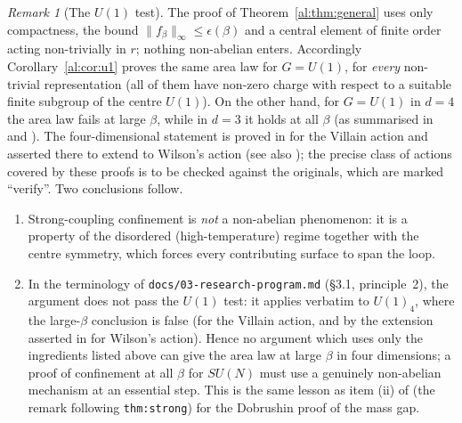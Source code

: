 \documentclass[11pt,a4paper]{article}
\theoremstyle{definition}
\theoremstyle{remark}
\newtheorem{remark}[theorem]{Remark}
\newcommand{\norm}[1]{\lVert #1\rVert}
\newcommand{\Fname}[2]{\cite[#1~`#2']{F}}
\begin{document}
\begin{remark}[The $U(1)$ test]\label{al:rem:u1test}
The proof of Theorem~\ref{al:thm:general} uses only compactness, the bound $\norm{f_\beta}_\infty\le\epsilon(\beta)$ and a
central element of finite order acting non-trivially in $r$; nothing non-abelian enters. Accordingly
Corollary~\ref{al:cor:u1} proves the same area law for $G=U(1)$, for \emph{every} non-trivial representation (all of them
have non-zero charge with respect to a suitable finite subgroup of the centre $U(1)$). On the other hand, for $G=U(1)$
in $d=4$ the area law fails at large $\beta$, while in $d=3$ it holds at all $\beta$ \cite{GM82}
(as summarised in \cite[Section~4]{Cha19b} and \cite[Section~1]{CNS25a}). The four-dimensional statement is proved in
\cite{FS82} for the Villain action and asserted there to extend to Wilson's action (see also \cite{Gut80}); the precise class
of actions covered by these proofs is to be checked against the originals, which are marked ``verify''. Two conclusions
follow.
\begin{enumerate}[label=(\roman*)]
\item Strong-coupling confinement is \emph{not} a non-abelian phenomenon: it is a property of the disordered
(high-temperature) regime together with the centre symmetry, which forces every contributing surface to span the loop.
\item In the terminology of \texttt{docs/03-research-program.md} (\S3.1, principle~2), the argument does not pass the
$U(1)$ test: it applies verbatim to $U(1)_4$, where the large-$\beta$ conclusion is false (for the Villain action, and by
the extension asserted in \cite{FS82} for Wilson's action). Hence no argument which uses
only the ingredients listed above can give the area law at large $\beta$ in four dimensions; a proof of confinement at
all $\beta$ for $SU(N)$ must use a genuinely non-abelian mechanism at an essential step. This is the same lesson as item (ii) of
\Fname{Remark}{On the constants and on what this proves} (the remark following \texttt{thm:strong}) for the Dobrushin
proof of the mass gap.
\end{enumerate}
\end{remark}
\end{document}
